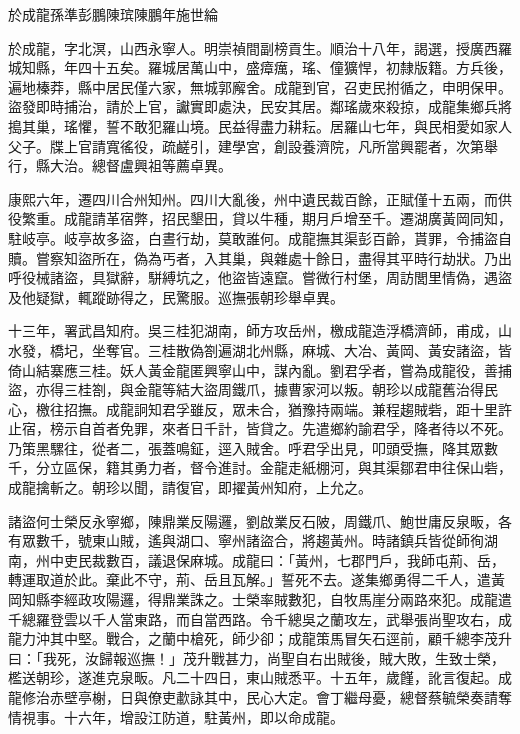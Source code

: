 
\begin{pinyinscope}
於成龍孫準彭鵬陳瑸陳鵬年施世綸

於成龍，字北溟，山西永寧人。明崇禎間副榜貢生。順治十八年，謁選，授廣西羅城知縣，年四十五矣。羅城居萬山中，盛瘴癘，瑤、僮獷悍，初隸版籍。方兵後，遍地榛莽，縣中居民僅六家，無城郭廨舍。成龍到官，召吏民拊循之，申明保甲。盜發即時捕治，請於上官，讞實即處決，民安其居。鄰瑤歲來殺掠，成龍集鄉兵將搗其巢，瑤懼，誓不敢犯羅山境。民益得盡力耕耘。居羅山七年，與民相愛如家人父子。牒上官請寬徭役，疏鹺引，建學宮，創設養濟院，凡所當興罷者，次第舉行，縣大治。總督盧興祖等薦卓異。

康熙六年，遷四川合州知州。四川大亂後，州中遺民裁百餘，正賦僅十五兩，而供役繁重。成龍請革宿弊，招民墾田，貸以牛種，期月戶增至千。遷湖廣黃岡同知，駐岐亭。岐亭故多盜，白晝行劫，莫敢誰何。成龍撫其渠彭百齡，貰罪，令捕盜自贖。嘗察知盜所在，偽為丐者，入其巢，與雜處十餘日，盡得其平時行劫狀。乃出呼役械諸盜，具獄辭，駢縛坑之，他盜皆遠竄。嘗微行村堡，周訪閭里情偽，遇盜及他疑獄，輒蹤跡得之，民驚服。巡撫張朝珍舉卓異。

十三年，署武昌知府。吳三桂犯湖南，師方攻岳州，檄成龍造浮橋濟師，甫成，山水發，橋圮，坐奪官。三桂散偽劄遍湖北州縣，麻城、大冶、黃岡、黃安諸盜，皆倚山結寨應三桂。妖人黃金龍匿興寧山中，謀內亂。劉君孚者，嘗為成龍役，善捕盜，亦得三桂劄，與金龍等結大盜周鐵爪，據曹家河以叛。朝珍以成龍舊治得民心，檄往招撫。成龍詗知君孚雖反，眾未合，猶豫持兩端。兼程趨賊砦，距十里許止宿，榜示自首者免罪，來者日千計，皆貸之。先遣鄉約諭君孚，降者待以不死。乃策黑騾往，從者二，張蓋鳴鉦，逕入賊舍。呼君孚出見，叩頭受撫，降其眾數千，分立區保，籍其勇力者，督令進討。金龍走紙棚河，與其渠鄒君申往保山砦，成龍擒斬之。朝珍以聞，請復官，即擢黃州知府，上允之。

諸盜何士榮反永寧鄉，陳鼎業反陽邏，劉啟業反石陂，周鐵爪、鮑世庸反泉畈，各有眾數千，號東山賊，遙與湖口、寧州諸盜合，將趨黃州。時諸鎮兵皆從師徇湖南，州中吏民裁數百，議退保麻城。成龍曰：「黃州，七郡門戶，我師屯荊、岳，轉運取道於此。棄此不守，荊、岳且瓦解。」誓死不去。遂集鄉勇得二千人，遣黃岡知縣李經政攻陽邏，得鼎業誅之。士榮率賊數犯，自牧馬崖分兩路來犯。成龍遣千總羅登雲以千人當東路，而自當西路。令千總吳之蘭攻左，武舉張尚聖攻右，成龍力沖其中堅。戰合，之蘭中槍死，師少卻；成龍策馬冒矢石逕前，顧千總李茂升曰：「我死，汝歸報巡撫！」茂升戰甚力，尚聖自右出賊後，賊大敗，生致士榮，檻送朝珍，遂進克泉畈。凡二十四日，東山賊悉平。十五年，歲饉，訛言復起。成龍修治赤壁亭榭，日與僚吏歗詠其中，民心大定。會丁繼母憂，總督蔡毓榮奏請奪情視事。十六年，增設江防道，駐黃州，即以命成龍。


\end{pinyinscope}
